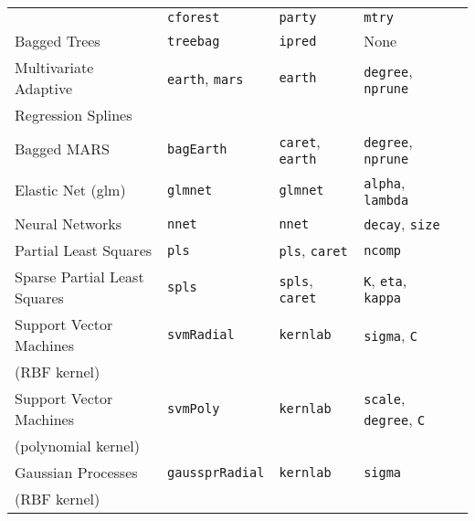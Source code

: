 \documentclass[12pt]{article}
\begin{document}
\begin{longtable}{lllll}
       & 
         \texttt{cforest} & 
            \texttt{party}       & 
            \texttt{mtry} \\     
                        
      Bagged Trees &
         \texttt{treebag} & 
            \texttt{ipred}       & 
            None \\                         
   
      Multivariate Adaptive  &
         \texttt{earth}, \texttt{mars} & 
            \texttt{earth}       & 
            \texttt{degree}, \texttt{nprune} \\            
      \:\: Regression Splines & & &\\
            
      Bagged MARS &
         \texttt{bagEarth} & 
            \texttt{caret},  \texttt{earth}      & 
            \texttt{degree}, \texttt{nprune} \\ 
            
      Elastic Net (glm) &               
         \texttt{glmnet} & 
            \texttt{glmnet}       &       
            \texttt{alpha}, \texttt{lambda} \\ 
            
      Neural Networks &               
         \texttt{nnet} & 
            \texttt{nnet}       &       
            \texttt{decay}, \texttt{size} \\      
      
      Partial Least Squares &
         \texttt{pls} & 
            \texttt{pls}, \texttt{caret}       & 
            \texttt{ncomp} \\      

      Sparse Partial Least Squares &
         \texttt{spls} & 
            \texttt{spls}, \texttt{caret}      & 
            \texttt{K}, \texttt{eta}, \texttt{kappa} \\   
            
      Support Vector Machines  &
         \texttt{svmRadial} & 
            \texttt{kernlab}       & 
            \texttt{sigma}, \texttt{C} \\            
      \:\: (RBF kernel) & & &\\   
      
      Support Vector Machines  &
         \texttt{svmPoly} & 
            \texttt{kernlab}       & 
            \texttt{scale}, \texttt{degree}, \texttt{C} \\            
      \:\: (polynomial kernel) & & &\\  
     Gaussian Processes  &
         \texttt{gaussprRadial} & 
            \texttt{kernlab}       & 
            \texttt{sigma} \\            
      \:\: (RBF kernel) & & &\\   
      

\end{longtable}
\end{document}
